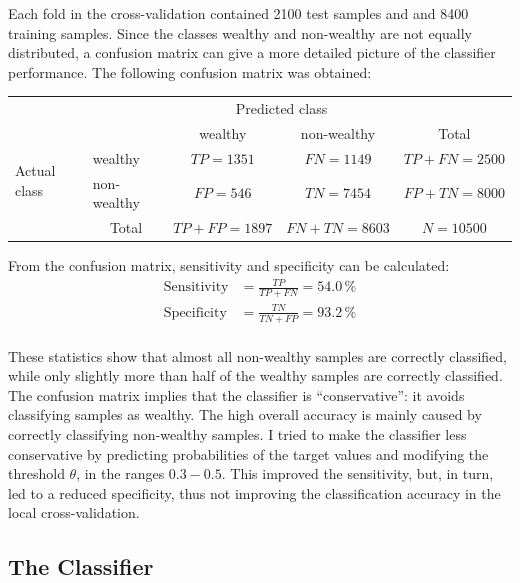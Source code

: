 \documentclass{article}
\begin{document}
Each fold in the cross-validation contained 2100 test samples and and 8400 training samples. Since the classes wealthy and non-wealthy are not equally distributed, a confusion matrix can give a more detailed picture of the classifier performance. The following confusion matrix was obtained:

\begin{table}
\centering
\begin{tabular}{l|l|c|c|c}
\multicolumn{2}{c}{}&\multicolumn{2}{c}{Predicted class}&\\
\cline{3-4}
\multicolumn{2}{c|}{}&wealthy & non-wealthy &\multicolumn{1}{c}{Total}\\
\cline{2-4}
\multirow{2}{*}{Actual class}& wealthy & $TP = 1351$ & $FN = 1149$ & $TP+FN = 2500$\\
\cline{2-4}
& non-wealthy & $FP = 546$ & $TN = 7454$ & $FP+TN = 8000$\\
\cline{2-4}
\multicolumn{1}{c}{} & \multicolumn{1}{c}{Total} & \multicolumn{1}{c}{$TP+FP=1897$} & \multicolumn{1}{c}{$FN+TN = 8603$} & \multicolumn{1}{c}{$N = 10500$}\\
\end{tabular}
\end{table}

From the confusion matrix, sensitivity and specificity can be calculated:
\begin{align}
\text{Sensitivity} &= \frac{TP}{TP + FN} = 54.0\,\%\\
\text{Specificity}    &= \frac{TN}{TN + FP} = 93.2\,\%\\
\end{align}



These statistics show that almost all non-wealthy samples are correctly classified, while only slightly more than half of the wealthy samples are correctly classified. The confusion matrix implies that the classifier is ``conservative'': it avoids classifying samples as wealthy. The high overall accuracy is mainly caused by correctly classifying non-wealthy samples. I tried to make the classifier less conservative by predicting probabilities of the target values and modifying the threshold $\theta$, in the ranges $0.3 - 0.5$. This improved the sensitivity, but, in turn, led to a reduced specificity, thus not improving the classification accuracy in the local cross-validation.

\subsection{The Classifier}
\end{document}
